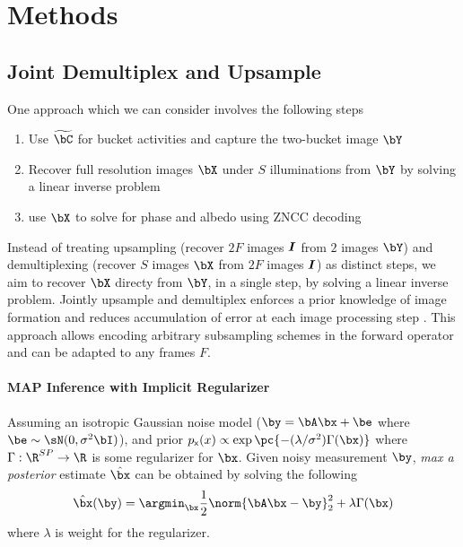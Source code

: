 \documentclass[../writeup.tex]{subfiles}
\begin{document}
  


\section{Methods}


\subsection{Joint Demultiplex and Upsample}

One approach which we can consider involves the following steps
\begin{enumerate}
    \item Use $\widetilde{\bC}$ for bucket activities and capture the two-bucket image $\bY$
    \item Recover full resolution images $\bX$ under $S$ illuminations from $\bY$ by solving a linear inverse problem
    \item use $\bX$ to solve for phase and albedo using ZNCC decoding \cite{mirdehghanOptimalStructuredLight2018}
\end{enumerate}
Instead of treating upsampling (recover $2F$ images $\boldsymbol{I}$ from $2$ images $\bY$) and demultiplexing (recover $S$ images $\bX$ from $2F$ images $\boldsymbol{I}$) as distinct steps, we aim to recover $\bX$ directy from $\bY$, in a single step, by solving a linear inverse problem. Jointly upsample and demultiplex enforces a prior knowledge of image formation and reduces accumulation of error at each image processing step \cite{heideFlexISPFlexibleCamera2014}. This approach allows encoding arbitrary subsampling schemes in the forward operator and can be adapted to any frames $F$. 

\paragraph{MAP Inference with Implicit Regularizer}
Assuming an isotropic Gaussian noise model ($\by=\bA\bx + \be$ where $\be\sim \sN(0,\sigma^2 \bI)$), and prior $p_{\rx}(x) \propto \exp\pc{- (\lambda/\sigma^2) \Gamma(\bx) }$ where $\Gamma:\R^{SP}\to\R$ is some regularizer for $\bx$. Given noisy measurement $\by$, \textit{max a posterior} estimate $\hat{\bx}$ can be obtained by solving the following
\begin{align}
    \hat{\bx}(\by)
        = \argmin_{\bx}
        \frac{1}{2} \norm{\bA\bx-\by}_2^2 + \lambda \Gamma(\bx)
    \label{eq:generic_prior_inverse_problem}
\end{align}
where $\lambda$ is weight for the regularizer. 
\end{document}
